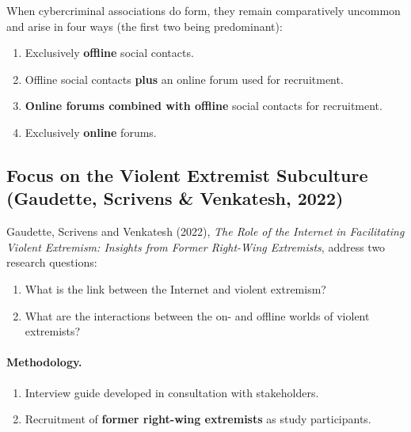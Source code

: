 \documentclass[11pt,a4paper,openany]{report}
\theoremstyle{definition}
\theoremstyle{plain}
\theoremstyle{remark}
\begin{document}
When cybercriminal associations do form, they remain comparatively uncommon and arise in four ways (the first two being predominant):
\begin{enumerate}
    \item Exclusively \textbf{offline} social contacts.
    \item Offline social contacts \textbf{plus} an online forum used for recruitment.
    \item \textbf{Online forums combined with offline} social contacts for recruitment.
    \item Exclusively \textbf{online} forums.
\end{enumerate}

\subsection{Focus on the Violent Extremist Subculture (Gaudette, Scrivens \& Venkatesh, 2022)}

Gaudette, Scrivens and Venkatesh (2022), \textit{The Role of the Internet in Facilitating Violent Extremism: Insights from Former Right-Wing Extremists}, address two research questions:
\begin{enumerate}
    \item What is the link between the Internet and violent extremism?
    \item What are the interactions between the on- and offline worlds of violent extremists?
\end{enumerate}

\paragraph{Methodology.}
\begin{enumerate}
    \item Interview guide developed in consultation with stakeholders.
    \item Recruitment of \textbf{former right-wing extremists} as study participants.
\end{enumerate}
\end{document}
